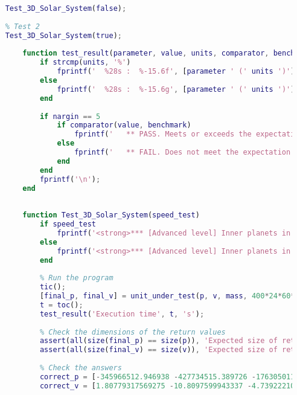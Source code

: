 \begin{lstlisting}[language=Matlab, caption={MATLAB Code that tests Solar System Function}]
    % Test 1
    Test_3D_Solar_System(false);
    
    % Test 2
    Test_3D_Solar_System(true);
    
        function test_result(parameter, value, units, comparator, benchmark)
            if strcmp(units, '%')
                fprintf('  %28s :  %-15.6f', [parameter ' (' units ')'], value);
            else
                fprintf('  %28s :  %-15.6g', [parameter ' (' units ')'], value);
            end
    
            if nargin == 5
                if comparator(value, benchmark)
                    fprintf('   ** PASS. Meets or exceeds the expectation of %g%s', benchmark, units);
                else
                    fprintf('   ** FAIL. Does not meet the expectation of %g%s', benchmark, units);
                end
            end
            fprintf('\n');
        end
    
    
        function Test_3D_Solar_System(speed_test)
            if speed_test
                fprintf('<strong>*** [Advanced level] Inner planets in 3D (execution speed test)</strong>\n');
            else
                fprintf('<strong>*** [Advanced level] Inner planets in 3D</strong>\n');
            end
    
            % Run the program
            tic();
            [final_p, final_v] = unit_under_test(p, v, mass, 400*24*60*60, speed_test);
            t = toc();
            test_result('Execution time', t, 's');
            
            % Check the dimensions of the return values
            assert(all(size(final_p) == size(p)), 'Expected size of return value "p" to be %ix%i, received %ix%i instead.', size(p,1), size(p,2), size(final_p, 1), size(final_p, 2));
            assert(all(size(final_v) == size(v)), 'Expected size of return value "v" to be %ix%i, received %ix%i instead.', size(v,1), size(v,2), size(final_p, 1), size(final_p, 2));
            
            % Check the answers
            correct_p = [-345966512.946938 -427734515.389726 -176305011.39972;-146624134718.92 23657267681.4718 10263838966.7501;18103318019.8 -57037628697.2036 -32327489902.5598;32774480992.525 -94215943100.9452 -44459425421.2662;-136512481872.172 183605819453.111 87921613716.9978];
            correct_v = [1.80779317569275 -10.8097599943337 -4.73922210995349;-5754.8524496641 -27006.432527836 -11711.495344779;37086.6176187111 15367.1705312566 4360.22910247245;33125.9176644671 10361.9441289187 2564.05625302394;-19228.3713286498 -10562.8647670158 -4323.54314113474];
            

\end{lstlisting}
